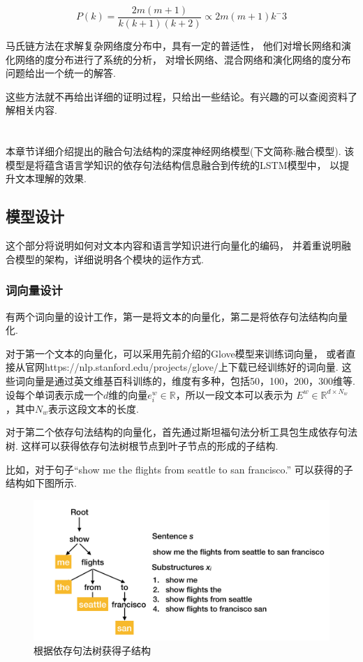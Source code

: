 \documentclass[bachelor,adobefonts]{jnuthesis}
\begin{document}
\begin{equation}
  P(k) = \frac{2m(m+1)}{k(k+1)(k+2)}
  \propto2m(m+1)k^-3
\end{equation}

马氏链方法在求解复杂网络度分布中，具有一定的普适性，
他们对增长网络和演化网络的度分布进行了系统的分析，
对增长网络、混合网络和演化网络的度分布问题给出一个统一的解答.

这些方法就不再给出详细的证明过程，只给出一些结论。有兴趣的可以查阅资料了解相关内容.






\chapter{}
本章节详细介绍提出的融合句法结构的深度神经网络模型(下文简称:融合模型).
该模型是将蕴含语言学知识的依存句法结构信息融合到传统的LSTM模型中，
以提升文本理解的效果.
\section{模型设计}
这个部分将说明如何对文本内容和语言学知识进行向量化的编码，
并着重说明融合模型的架构，详细说明各个模块的运作方式.
\subsection{词向量设计}
有两个词向量的设计工作，第一是将文本的向量化，第二是将依存句法结构向量化.

对于第一个文本的向量化，可以采用先前介绍的Glove模型来训练词向量，
或者直接从官网https://nlp.stanford.edu/projects/glove/上下载已经训练好的词向量.
这些词向量是通过英文维基百科训练的，维度有多种，包括50，100，200，300维等.
设每个单词表示成一个$d$维的向量$e_{i}^{w} \in \mathbb{R}$，所以一段文本可以表示为
$E^{w} \in \mathbb{R}^{d \times N_{w}}$，其中$N_{w}$表示这段文本的长度.

对于第二个依存句法结构的向量化，首先通过斯坦福句法分析工具包生成依存句法树.
这样可以获得依存句法树根节点到叶子节点的形成的子结构.

比如，对于句子“show me the flights from seattle to san francisco.”
可以获得的子结构如下图所示.

\begin{figure}[h!]
  \centering
  \includegraphics[width=0.8\linewidth]{yicunjufashujuli.png}
  \caption{根据依存句法树获得子结构}
\end{figure}
\end{document}
